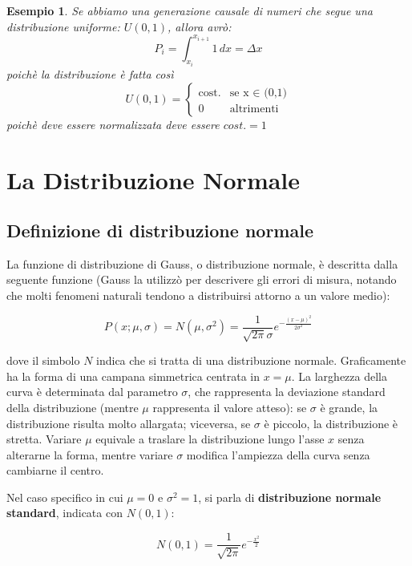 \documentclass[openany,a4paper,12pt]{book}
\newtheorem*{example}{Esempio}
\theoremstyle{remark}
\begin{document}
\begin{example}
    Se abbiamo una generazione causale di numeri che segue una distribuzione uniforme: $U(0,1)$, allora avrò:
    \[
    P_i=\int_{x_i}^{x_{i+1}} 1 \, dx = \Delta x
    \]
    poichè la distribuzione è fatta così
    \[
    U(0,1)= 
    \begin{cases}
    \text{cost.} &  \text{se x $\in$ (0,1)} \\
    0 & \text{altrimenti}
    \end{cases}
    \]
    poichè deve essere normalizzata deve essere $cost.=1$
\end{example}


\section{La Distribuzione Normale}


\subsection*{Definizione di distribuzione normale}

La funzione di distribuzione di Gauss, o distribuzione normale, è descritta dalla seguente funzione (Gauss la utilizzò per descrivere gli errori di misura, notando che molti fenomeni naturali tendono a distribuirsi attorno a un valore medio):

\begin{equation}
P(x; \mu , \sigma ) = N(\mu,\sigma^2) = \frac{1}{\sqrt{2\pi}\sigma}e^{-\frac{(x-\mu)^2}{2\sigma^2}}
\end{equation}

dove il simbolo $N$ indica che si tratta di una distribuzione normale.
Graficamente ha la forma di una campana simmetrica centrata in $x = \mu$. La larghezza della curva è determinata dal parametro $\sigma$, che rappresenta la deviazione standard della distribuzione (mentre $\mu$ rappresenta il valore atteso): se $\sigma$ è grande, la distribuzione risulta molto allargata; viceversa, se $\sigma$ è piccolo, la distribuzione è stretta.
Variare $\mu$ equivale a traslare la distribuzione lungo l'asse $x$ senza alterarne la forma, mentre variare $\sigma$ modifica l'ampiezza della curva senza cambiarne il centro.

Nel caso specifico in cui $\mu = 0$ e $\sigma^2 = 1$, si parla di \textbf{distribuzione normale standard}, indicata con $N(0,1)$:

\begin{equation}
N(0,1) = \frac{1}{\sqrt{2 \pi}} e^{-\frac{x^2}{2}}
\end{equation}
\end{document}
